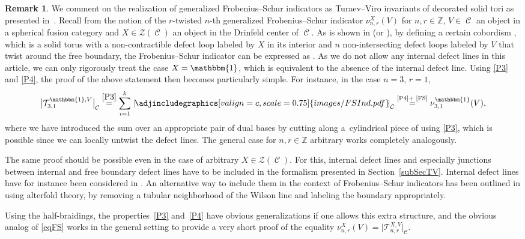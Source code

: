 \documentclass[pdftex]{sigma}
\DeclareMathOperator{\calc}{\mathcal{C}}
\numberwithin{equation}{section}
\theoremstyle{definition}
\newtheorem{Remark}[Remark]{Remark}
\begin{document}
\begin{Remark}
 We comment on the realization of generalized Frobenius--Schur indicators as Turaev--Viro invariants of decorated solid tori as presented in~\cite{FS}. Recall from \cite[Definition~2.1]{NS} the notion of the $r$-twisted $n$-th generalized Frobenius--Schur indicator $\nu_{n, r}^X(V)$ for $n, r \in \mathbb{Z}$, $V \in \calc$ an object in a spherical fusion category and $X \in \mathcal{Z}(\calc)$ an object in the Drinfeld center of $\calc$. As is shown in \cite[Proposition 14]{FS} (or \cite[Theorem~5.0.1]{F}), by defining a certain cobordism , which is a solid torus with a non-contractible defect loop labeled by $X$ in its interior and $n$ non-intersecting defect loops labeled by $V$ that twist around the free boundary, the Frobenius--Schur indicator can be expressed as \smash{$\nu_{n, r}^X(V) = \bigl|\mathcal{T}_{n,r}^{X, V}\bigr|_{\calc}$}. As we do not allow any internal defect lines in this article, we can only rigorously treat the case $X = \mathbbm{1}$, which is equivalent to the absence of the internal defect line. Using \ref{P3} and \ref{P4}, the proof of the above statement then becomes particularly simple. For instance, in the case $n = 3$, $r = 1$,
 \begin{align}
 \label{eqFS}
 \bigl|\mathcal{T}_{3, 1}^{\mathbbm{1}, V}\bigr|_{\calc} \overset{\rm \ref{P3}}{=} \sum_{i = 1}^k \, \left| \! \adjincludegraphics[valign=c, scale = 0.75]{images/FSInd.pdf} \! \right|_{\calc} \overset{\text{\ref{P4}} + \text{ \cite[(2.4)]{FS}}}{=} \nu_{3, 1}^{\mathbbm{1}}(V),
 \end{align}
 where we have introduced the sum over an appropriate pair of dual bases by cutting along a~cylindrical piece of  using \ref{P3}, which is possible since we can locally untwist the defect lines. The general case for $n, r \in \mathbb{Z}$ arbitrary works completely analogously.

 The same proof should be possible even in the case of arbitrary $X \in \mathcal{Z}(\calc)$. For this, internal defect lines and especially junctions between internal and free boundary defect lines have to be included in the formalism presented in Section~\ref{subSecTV}. Internal defect lines have for instance been considered in \cite{F, FS, TV}. An alternative way to include them in the context of Frobenius--Schur indicators has been outlined in \cite[Section~5]{LMWW} using alterfold theory, by removing a tubular neighborhood of the Wilson line and labeling the boundary appropriately.

 Using the half-braidings, the properties~\ref{P3} and~\ref{P4} have obvious generalizations if one allows this extra structure, and the obvious analog of \eqref{eqFS} works in the general setting to provide a very short proof of the equality $\nu_{n, r}^X(V) = \bigl|\mathcal{T}_{n,r}^{X, V}\bigr|_{\calc}$.
\end{Remark}
\end{document}
